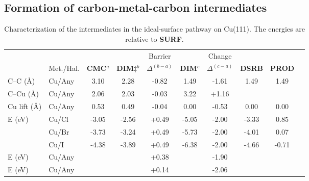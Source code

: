 \documentclass[journal=jacsat,manuscript=article]{achemso}
\begin{document}
\ifdefined\INTERAL
\subsection{Formation of carbon-metal-carbon intermediates}
\fi

\begin{table}
\centering
\caption{Characterization of the intermediates in the ideal-surface pathway on Cu(111). %
The energies are relative to \textbf{SURF}.
}
\label{table:idealsurface}
\begin{tabular}{ llcccccccc  }
 \hline
 \hline
  & & &  & Barrier & & Change & &\\
  & Met./Hal. & \textbf{CMC}$^{a}$ & \textbf{DIM$\ddagger$}$^{b}$ & $\Delta^{(b-a)}$ &  \textbf{DIM}$^{c}$ & $\Delta^{(c-a)}$  & \textbf{DSRB} & \textbf{PROD} \\ 
 \hline 
 C--C (\si{\angstrom}) & Cu/Any & 3.10 & 2.28 & -0.82 & 1.49 & -1.61 & 1.49 & 1.49 \\ 
 \hline
 C--Cu (\si{\angstrom}) & Cu/Any & 2.06 & 2.03 & -0.03 & 3.22 & +1.16 & & \\
 \hline
 Cu lift (\si{\angstrom}) & Cu/Any & 0.53 & 0.49& -0.04  & 0.00 & -0.53 & 0.00 & 0.00 \\
 \hline
 \multirow{3}{*}{E (\si{\electronvolt}) } & Cu/Cl & -3.05 &-2.56 &+0.49 & -5.05 & -2.00& -3.33&0.85\\ 
 & Cu/Br & -3.73 & -3.24 &+0.49 & -5.73 & -2.00& -4.01&0.07\\ 
 & Cu/I  & -4.38 & -3.89 & +0.49 & -6.38 & -2.00& -4.66&-0.71\\ 
 \hline
 E (\si{\electronvolt})~\cite{pccp2010} & Cu/Any &  &  & +0.38& & -1.90 & & \\
 \hline
 E (\si{\electronvolt})~\cite{jacs2013} & Cu/Any & &  & +0.14& & -2.06 & &\\
 \hline
 \hline
\end{tabular}
\end{table}
\end{document}
